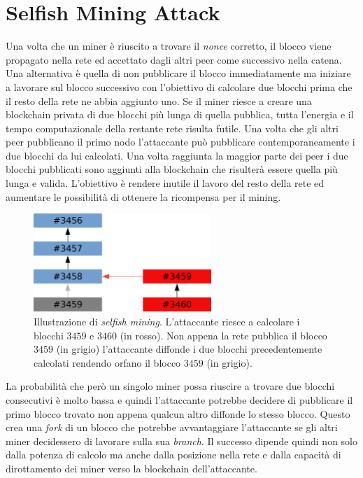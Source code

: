 \section{Selfish Mining Attack}
Una volta che un miner è riuscito a trovare il \textit{nonce} corretto, il blocco viene propagato nella rete ed accettato dagli altri peer come successivo nella catena.\newline
Una alternativa è quella di non pubblicare il blocco immediatamente ma iniziare a lavorare sul blocco successivo con l'obiettivo di calcolare due blocchi prima che il resto della rete ne abbia aggiunto uno. Se il miner riesce a creare una blockchain privata di due blocchi più lunga di quella pubblica, tutta l'energia e il tempo computazionale della restante rete risulta futile. Una volta che gli altri peer pubblicano il primo nodo l'attaccante può pubblicare contemporaneamente i due blocchi da lui calcolati. Una volta raggiunta la maggior parte dei peer i due blocchi pubblicati sono aggiunti alla blockchain che risulterà essere quella più lunga e valida. L'obiettivo è rendere inutile il lavoro del resto della rete ed aumentare le possibilità di ottenere la ricompensa per il mining.
\begin{figure}[H]
    \centering
    \includegraphics[width=0.6\textwidth]{images/selfish.png}
    \caption{Illustrazione di \textit{selfish mining}. L'attaccante riesce a calcolare i blocchi $3459$ e $3460$ (in rosso). Non appena la rete pubblica il blocco $3459$ (in grigio) l'attaccante diffonde i due blocchi precedentemente calcolati rendendo orfano il blocco $3459$ (in grigio).}
\end{figure}
La probabilità che però un singolo miner possa riuscire a trovare due blocchi consecutivi è molto bassa e quindi l'attaccante potrebbe decidere di pubblicare il primo blocco trovato non appena qualcun altro diffonde lo stesso blocco. Questo crea una \textit{fork} di un blocco che potrebbe avvantaggiare l'attaccante se gli altri miner decidessero di lavorare sulla sua \textit{branch}. Il successo dipende quindi non solo dalla potenza di calcolo ma anche dalla posizione nella rete e dalla capacità di dirottamento dei miner verso la blockchain dell'attaccante.

